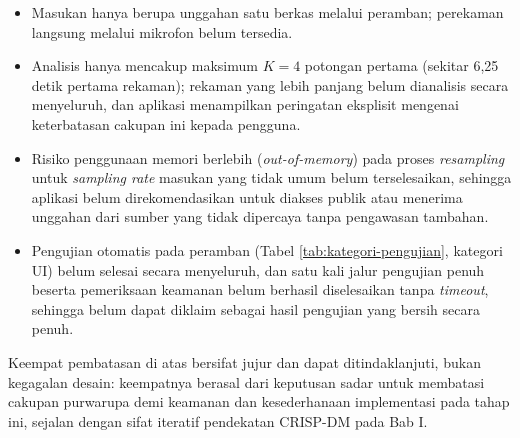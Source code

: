 \begin{itemize}
  \item Masukan hanya berupa unggahan satu berkas melalui peramban; perekaman
  langsung melalui mikrofon belum tersedia.
  \item Analisis hanya mencakup maksimum $K{=}4$ potongan pertama (sekitar
  6,25 detik pertama rekaman); rekaman yang lebih panjang belum dianalisis
  secara menyeluruh, dan aplikasi menampilkan peringatan eksplisit mengenai
  keterbatasan cakupan ini kepada pengguna.
  \item Risiko penggunaan memori berlebih (\textit{out-of-memory}) pada proses
  \textit{resampling} untuk \textit{sampling rate} masukan yang tidak umum
  belum terselesaikan, sehingga aplikasi belum direkomendasikan untuk diakses
  publik atau menerima unggahan dari sumber yang tidak dipercaya tanpa
  pengawasan tambahan.
  \item Pengujian otomatis pada peramban (Tabel \ref{tab:kategori-pengujian},
  kategori UI) belum selesai secara menyeluruh, dan satu kali jalur pengujian
  penuh beserta pemeriksaan keamanan belum berhasil diselesaikan tanpa
  \textit{timeout}, sehingga belum dapat diklaim sebagai hasil pengujian yang
  bersih secara penuh.
\end{itemize}

Keempat pembatasan di atas bersifat jujur dan dapat ditindaklanjuti, bukan
kegagalan desain: keempatnya berasal dari keputusan sadar untuk membatasi
cakupan purwarupa demi keamanan dan kesederhanaan implementasi pada tahap ini,
sejalan dengan sifat iteratif pendekatan CRISP-DM pada Bab I.
